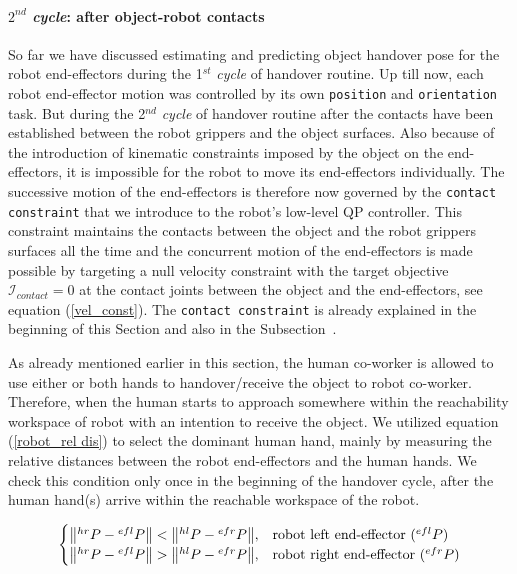 \paragraph*{$2^{nd}$ \textit{cycle}: after object-robot contacts} 
So far we have discussed estimating and predicting object handover pose for the robot end-effectors during the 1${}^{st}$ \textit{cycle} of handover routine. Up till now, each robot end-effector motion was controlled by its own \texttt{position} and \texttt{orientation} task. But during the 2$^{nd}$ \textit{cycle} of handover routine after the contacts have been established between the robot grippers and the object surfaces. Also because of the introduction of kinematic constraints imposed by the object on the end-effectors, it is impossible for the robot to move its end-effectors individually. The successive motion of the end-effectors is therefore now governed by the \texttt{contact constraint} that we introduce to the robot's low-level QP controller. This constraint maintains the contacts between the object and the robot grippers surfaces all the time and the concurrent motion of the end-effectors is made possible by targeting a null velocity constraint with the target objective $\mathscr{I}_{contact}=0$ at the contact joints between the object and the end-effectors, see equation (\ref{vel_const}). The \texttt{contact constraint} is already explained in the beginning of this Section and also in the Subsection~.

As already mentioned earlier in this section, the human co-worker is allowed to use either or both hands to handover/receive the object to robot co-worker. Therefore, when the human starts to approach somewhere within the reachability workspace of robot with an intention to receive the object. We utilized equation (\ref{robot_rel dis}) to select the dominant human hand, mainly by measuring the relative distances between the robot end-effectors and the human hands. We check this condition only once in the beginning of the handover cycle, after the human hand(s) arrive within the reachable workspace of the robot.

\begin{equation}\label{robot_rel dis}
\centering
\begin{cases}
\norm{{}^{hr}{P} - {}^{efl}{P}} < \norm{{}^{hl}{P} - {}^{efr}{P}}, &  \text{robot left end-effector (${}^{efl}{P}$)} \\
\norm{{}^{hr}{P} - {}^{efl}{P}} > \norm{{}^{hl}{P} - {}^{efr}{P}}, &  \text{robot right end-effector (${}^{efr}{P}$)} \\
\end{cases}
\end{equation}

